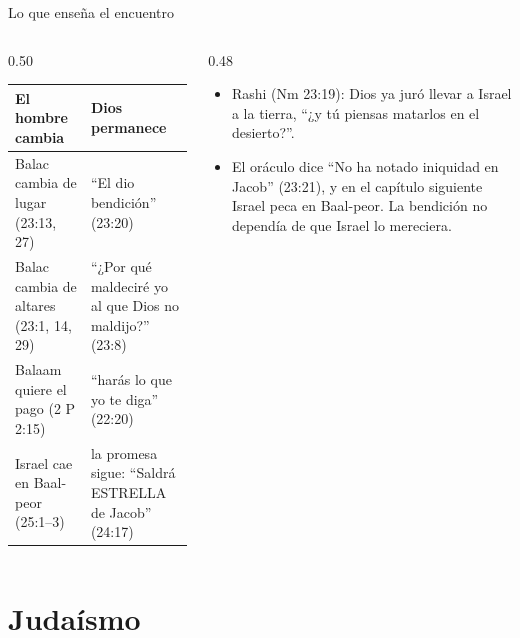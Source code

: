 \begin{frame}{Lo que enseña el encuentro}
\begin{columns}[t,onlytextwidth]
\begin{column}{0.50\textwidth}
\scriptsize\renewcommand{\arraystretch}{1.2}
\begin{tabular}{@{}>{\RaggedRight\arraybackslash}p{2.4cm}>{\RaggedRight\arraybackslash}p{3.3cm}@{}}
\toprule
\textbf{El hombre cambia} & \textbf{Dios permanece} \\ \midrule
Balac cambia de lugar (23:13, 27) & ``El dio bendición'' (23:20) \\
Balac cambia de altares (23:1, 14, 29) & ``¿Por qué maldeciré yo al que Dios no maldijo?'' (23:8) \\
Balaam quiere el pago (2 P 2:15) & ``harás lo que yo te diga'' (22:20) \\
Israel cae en Baal-peor (25:1--3) & la promesa sigue: ``Saldrá ESTRELLA de Jacob'' (24:17) \\
\bottomrule
\end{tabular}
\end{column}
\begin{column}{0.48\textwidth}\small
\begin{itemize}
\item Rashi (Nm 23:19): Dios ya juró llevar a Israel a la tierra, ``¿y tú piensas matarlos en el desierto?''.
\item El oráculo dice ``No ha notado iniquidad en Jacob'' (23:21), y en el capítulo siguiente Israel peca en Baal-peor. La bendición no dependía de que Israel lo mereciera.
\end{itemize}
\end{column}
\end{columns}
\end{frame}

\section{Judaísmo}

